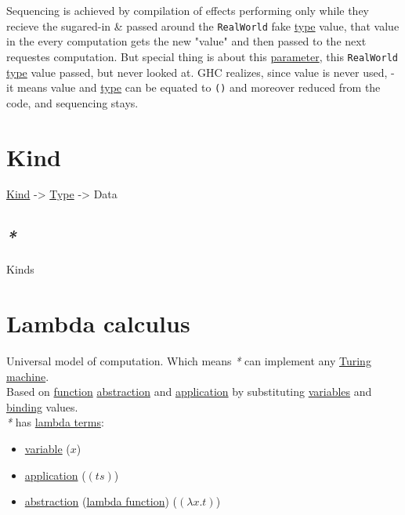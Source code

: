 \documentclass[a4paper,14pt,oneside]{book}
\begin{document}
Sequencing is achieved by compilation of effects performing only while they recieve the sugared-in \& passed around the \texttt{RealWorld} fake \hyperref[orgd6db20c]{type} value, that value in the every computation gets the new "value" and then passed to the next requestes computation. But special thing is about this \hyperref[orged2015b]{parameter}, this \texttt{RealWorld} \hyperref[orgd6db20c]{type} value passed, but never looked at. GHC realizes, since value is never used, - it means value and \hyperref[orgd6db20c]{type} can be equated to \texttt{()} and moreover reduced from the code, and sequencing stays.\\

\chapter{\label{orgdc485c3}Kind}
\label{sec:org1afc485}
\hyperref[orgdc485c3]{Kind} -> \hyperref[orgd6db20c]{Type} -> Data\\

\section{\emph{*}}
\label{sec:orge0ceb22}

\label{org73f8c0d}Kinds\\

\chapter{\label{org0f9cd10}Lambda calculus}
\label{sec:org6ea813e}
Universal model of computation. Which means \emph{*} can implement any \hyperref[org94f2766]{Turing machine}.\\
Based on \hyperref[org8cc2ae4]{function} \hyperref[orgb4a6914]{abstraction} and \hyperref[org5c027e8]{application} by substituting \hyperref[org8831698]{variables} and \hyperref[orgac1c0eb]{binding} values.\\

\emph{*} has \hyperref[orgf52d00b]{lambda terms}:\\
\begin{itemize}
\item \hyperref[org029d8fd]{variable} (\(x\))\\
\item \hyperref[org5c027e8]{application} (\((ts)\))\\
\item \hyperref[orgb4a6914]{abstraction} (\hyperref[org61a8244]{lambda function}) (\((\lambda x . t)\))\\
\end{itemize}
\end{document}
